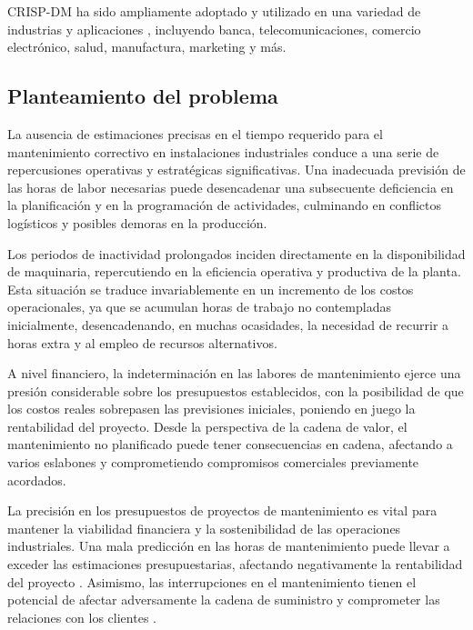 \documentclass[
  11pt,
  bookmarksnumbered]{article}
\begin{document}
CRISP-DM ha sido ampliamente adoptado y utilizado en una variedad de industrias y aplicaciones \textcite{Pyle1999}, incluyendo banca, telecomunicaciones, comercio electrónico, salud, manufactura, marketing y más.

\hypertarget{planteamiento-del-problema}{%
\subsection{Planteamiento del problema}\label{planteamiento-del-problema}}

La ausencia de estimaciones precisas en el tiempo requerido para el mantenimiento correctivo en instalaciones industriales conduce a una serie de repercusiones operativas y estratégicas significativas.
Una inadecuada previsión de las horas de labor necesarias puede desencadenar una subsecuente deficiencia en la planificación y en la programación de actividades, culminando en conflictos logísticos y posibles demoras en la producción.

Los periodos de inactividad prolongados inciden directamente en la disponibilidad de maquinaria, repercutiendo en la eficiencia operativa y productiva de la planta.
Esta situación se traduce invariablemente en un incremento de los costos operacionales, ya que se acumulan horas de trabajo no contempladas inicialmente, desencadenando, en muchas ocasidades, la necesidad de recurrir a horas extra y al empleo de recursos alternativos.

A nivel financiero, la indeterminación en las labores de mantenimiento ejerce una presión considerable sobre los presupuestos establecidos, con la posibilidad de que los costos reales sobrepasen las previsiones iniciales, poniendo en juego la rentabilidad del proyecto.
Desde la perspectiva de la cadena de valor, el mantenimiento no planificado puede tener consecuencias en cadena, afectando a varios eslabones y comprometiendo compromisos comerciales previamente acordados.

La precisión en los presupuestos de proyectos de mantenimiento es vital para mantener la viabilidad financiera y la sostenibilidad de las operaciones industriales.
Una mala predicción en las horas de mantenimiento puede llevar a exceder las estimaciones presupuestarias, afectando negativamente la rentabilidad del proyecto \textcite{Wang2017}.
Asimismo, las interrupciones en el mantenimiento tienen el potencial de afectar adversamente la cadena de suministro y comprometer las relaciones con los clientes \textcite{Cheng2019}.
\end{document}
